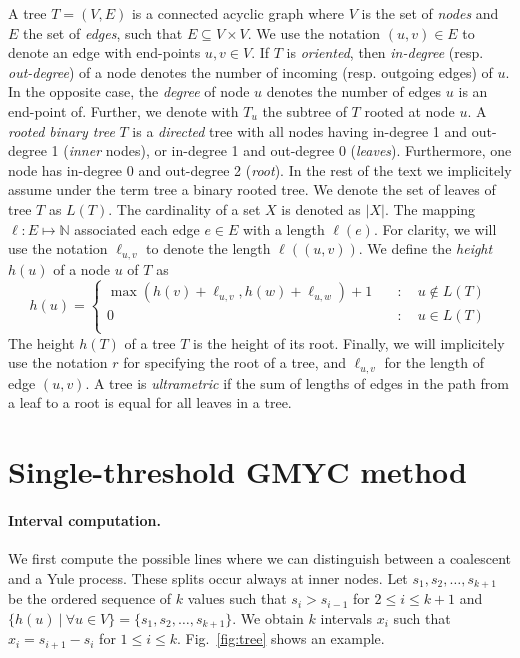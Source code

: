 \documentclass{llncs}
\begin{document}
A tree $T=(V,E)$ is a connected acyclic graph where $V$ is the set of {\em
nodes} and $E$ the set of {\em edges}, such that $E \subseteq V\times V$. We
use the notation $(u,v) \in E$ to denote an edge with end-points $u,v \in V$.
If $T$ is {\em oriented}, then {\em in-degree} (resp. {\em out-degree}) of a
node denotes the number of incoming (resp. outgoing edges) of $u$. In the
opposite case, the {\em degree} of node $u$ denotes the number of edges $u$ is
an end-point of.  Further, we denote with $T_u$ the subtree of $T$ rooted at
node $u$.  A {\em rooted binary tree} $T$ is a {\em directed} tree with all
nodes having in-degree 1 and out-degree 1 ({\em inner} nodes), or in-degree 1
and out-degree 0 ({\em leaves}). Furthermore, one node has in-degree 0 and
out-degree 2 ({\em root}).  In the rest of the text we implicitely assume under
the term tree a binary rooted tree.  We denote the set of leaves of tree $T$ as
$L(T)$.  The cardinality of a set $X$ is denoted as $|X|$. The mapping $\ell :
E \mapsto \mathbb{N}$ associated each edge $e \in E$ with a length $\ell(e)$.
For clarity, we will use the notation $\ell_{u,v}$ to denote the length
$\ell((u,v))$.  We define the {\em height} $h(u)$ of a node $u$ of $T$ as
%
\[ h(u) = \left\{ \begin{array}{ll}
\max(h(v) + \ell_{u,v}, h(w) + \ell_{u,w}) + 1 & \quad : \quad u \notin L(T)\\
0                                                & \quad : \quad u    \in L(T)\\
\end{array}\right. \] 
The height $h(T)$ of a tree $T$ is the height of its root. Finally, we will
implicitely use the notation $r$ for specifying the root of a tree, and
$\ell_{u,v}$ for the length of edge $(u,v)$.  A tree is {\em ultrametric} if
the sum of lengths of edges in the path from a leaf to a root is equal for all
leaves in a tree.

\section{Single-threshold GMYC method}

\paragraph{\bf Interval computation.}
We first compute the possible lines where we can distinguish between a
coalescent and a Yule process. These splits occur always at inner nodes.  Let
$s_1, s_2, \ldots, s_{k+1}$ be the ordered sequence of $k$ values such that
$s_i> s_{i-1}$ for $2 \leq i \leq k+1$ and $\{ h(u) \ |\ \forall u \in V\} = \{
s_1, s_2, \ldots, s_{k+1}\}$.  We obtain $k$ intervals $x_i$ such that $x_i =
s_{i+1} - s_i$ for $1 \leq i \leq k$. Fig.~\ref{fig:tree} shows an example.
\end{document}
